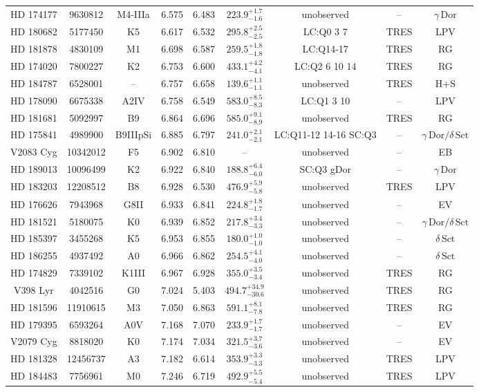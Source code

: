 \begin{table*}
\begin{tabular}{ccccccccc}
HD 174177 & 9630812 & M4-IIIa & 6.575 & 6.483 & $223.9^{+1.7}_{-1.6}$ & unobserved & -- & $\gamma\,\text{Dor}$ \\
HD 180682 & 5177450 & K5 & 6.617 & 6.532 & $295.8^{+2.5}_{-2.5}$ & LC:Q0 3 7 & TRES & LPV \\
HD 181878 & 4830109 & M1 & 6.698 & 6.587 & $259.5^{+1.8}_{-1.8}$ & LC:Q14-17 & TRES & RG \\
HD 174020 & 7800227 & K2 & 6.753 & 6.600 & $433.1^{+4.2}_{-4.1}$ & LC:Q2 6 10 14 & TRES & RG \\
HD 184787 & 6528001 & -- & 6.757 & 6.658 & $139.6^{+1.1}_{-1.1}$ & unobserved & TRES & H+S \\
HD 178090 & 6675338 & A2IV & 6.758 & 6.549 & $583.0^{+8.5}_{-8.3}$ & LC:Q1 3 10 & -- & LPV \\
HD 181681 & 5092997 & B9 & 6.864 & 6.696 & $585.0^{+9.1}_{-8.9}$ & unobserved & TRES & RG \\
HD 175841 & 4989900 & B9IIIpSi & 6.885 & 6.797 & $241.0^{+2.1}_{-2.1}$ & LC:Q11-12 14-16 SC:Q3 & -- & $\gamma\,\text{Dor} /\delta\,\text{Sct}$ \\
V2083 Cyg & 10342012 & F5 & 6.902 & 6.810 & -- & unobserved & -- & EB \\
HD 189013 & 10096499 & K2 & 6.922 & 6.840 & $188.8^{+6.4}_{-6.0}$ & SC:Q3 gDor & -- & $\gamma\,\text{Dor}$ \\
HD 183203 & 12208512 & B8 & 6.928 & 6.530 & $476.9^{+5.9}_{-5.8}$ & unobserved & TRES & LPV \\
HD 176626 & 7943968 & G8II & 6.933 & 6.841 & $224.8^{+1.8}_{-1.7}$ & unobserved & -- & EV \\
HD 181521 & 5180075 & K0 & 6.939 & 6.852 & $217.8^{+3.4}_{-3.3}$ & unobserved & -- & $\gamma\,\text{Dor} /\delta\,\text{Sct}$ \\
HD 185397 & 3455268 & K5 & 6.953 & 6.855 & $180.0^{+1.0}_{-1.0}$ & unobserved & -- & $\delta\,\text{Sct}$ \\
HD 186255 & 4937492 & A0 & 6.966 & 6.862 & $254.5^{+4.1}_{-4.0}$ & unobserved & -- & $\delta\,\text{Sct}$ \\
HD 174829 & 7339102 & K1III & 6.967 & 6.928 & $355.0^{+3.5}_{-3.4}$ & unobserved & TRES & RG \\
V398 Lyr & 4042516 & G0 & 7.024 & 5.403 & $494.7^{+34.9}_{-30.6}$ & unobserved & TRES & RG \\
HD 181596 & 11910615 & M3 & 7.050 & 6.863 & $591.1^{+8.1}_{-7.8}$ & unobserved & TRES & RG \\
HD 179395 & 6593264 & A0V & 7.168 & 7.070 & $233.9^{+1.7}_{-1.7}$ & unobserved & -- & EV \\
V2079 Cyg & 8818020 & K0 & 7.174 & 7.034 & $321.5^{+3.7}_{-3.6}$ & unobserved & -- & EV \\
HD 181328 & 12456737 & A3 & 7.182 & 6.614 & $353.9^{+3.3}_{-3.3}$ & unobserved & TRES & LPV \\
HD 184483 & 7756961 & M0 & 7.246 & 6.719 & $492.9^{+5.5}_{-5.4}$ & unobserved & TRES & LPV \\
\hline
\end{tabular}
\end{table*}
